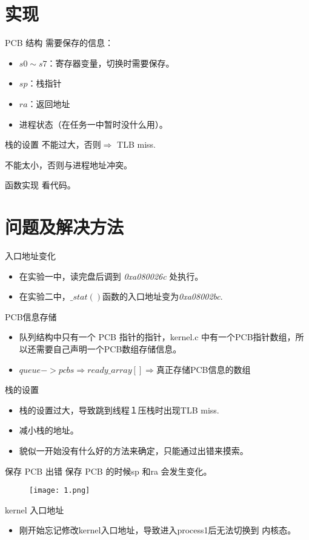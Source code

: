\documentclass{beamer}
\begin{document}
\section{实现}
\begin{frame}{PCB 结构}
需要保存的信息：
\begin{itemize}
	\item $s0\sim s7$：寄存器变量，切换时需要保存。
	\item $sp$：栈指针
	\item $ra$：返回地址
	\item 进程状态（在任务一中暂时没什么用）。
\end{itemize}
\end{frame}

\begin{frame}{栈的设置}
不能过大，否则$\Rightarrow$ TLB miss.

不能太小，否则与进程地址冲突。 
\end{frame}

\begin{frame}{函数实现}
看代码。
\end{frame}

\section{问题及解决方法}
\begin{frame}{入口地址变化}
\begin{itemize}
	\item 在实验一中，读完盘后调到 \emph{0xa080026c} 处执行。\\
	\item 在实验二中，$\_stat()$函数的入口地址变为\emph{0xa08002bc}.
	
\end{itemize}
\end{frame}

\begin{frame}{PCB信息存储}
\begin{itemize}
	\item 队列结构中只有一个 PCB 指针的指针，kernel.c 
	中有一个PCB指针数组，所以还需要自己声明一个PCB数组存储信息。
	\item $queue->pcbs \Rightarrow ready\_array[]\Rightarrow$真正存储PCB信息的数组
\end{itemize}
\end{frame}

\begin{frame}{栈的设置}
\begin{itemize}
	\item 栈的设置过大，导致跳到线程１压栈时出现TLB miss.
	\item 减小栈的地址。
	\item 貌似一开始没有什么好的方法来确定，只能通过出错来摸索。
\end{itemize}
\end{frame}

\begin{frame}{保存 PCB 出错}
保存 PCB 的时候sp 和ra 会发生变化。
\begin{figure}
	\texttt{[image: 1.png]}
\end{figure}
\end{frame}

\begin{frame}{kernel 入口地址}
\begin{itemize}
	\item 刚开始忘记修改kernel入口地址，导致进入process1后无法切换到
	内核态。
\end{itemize}
\end{frame}
\end{document}
